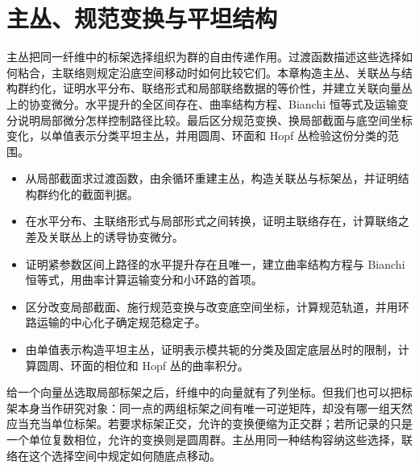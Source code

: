 
% 
% 

\chapter{主丛、规范变换与平坦结构}
\label{g1:ch:18}

\begin{chapterabstract}
	主丛把同一纤维中的标架选择组织为群的自由传递作用。过渡函数描述这些选择如何粘合，主联络则规定沿底空间移动时如何比较它们。本章构造主丛、关联丛与结构群约化，证明水平分布、联络形式和局部联络数据的等价性，并建立关联向量丛上的协变微分。水平提升的全区间存在、曲率结构方程、Bianchi 恒等式及运输变分说明局部微分怎样控制路径比较。最后区分规范变换、换局部截面与底空间坐标变化，以单值表示分类平坦主丛，并用圆周、环面和 Hopf 丛检验这份分类的范围。
\end{chapterabstract}

\begin{learninggoals}
	\begin{itemize}
		\item 从局部截面求过渡函数，由余循环重建主丛，构造关联丛与标架丛，并证明结构群约化的截面判据。
		\item 在水平分布、主联络形式与局部形式之间转换，证明主联络存在，计算联络之差及关联丛上的诱导协变微分。
		\item 证明紧参数区间上路径的水平提升存在且唯一，建立曲率结构方程与 Bianchi 恒等式，用曲率计算运输变分和小环路的首项。
		\item 区分改变局部截面、施行规范变换与改变底空间坐标，计算规范轨道，并用环路运输的中心化子确定规范稳定子。
		\item 由单值表示构造平坦主丛，证明表示模共轭的分类及固定底层丛时的限制，计算圆周、环面的相位和 Hopf 丛的曲率积分。
	\end{itemize}
\end{learninggoals}

给一个向量丛选取局部标架之后，纤维中的向量就有了列坐标。但我们也可以把标架本身当作研究对象：同一点的两组标架之间有唯一可逆矩阵，却没有哪一组天然应当充当单位标架。若要求标架正交，允许的变换便缩为正交群；若所记录的只是一个单位复数相位，允许的变换则是圆周群。主丛用同一种结构容纳这些选择，联络在这个选择空间中规定如何随底点移动。

